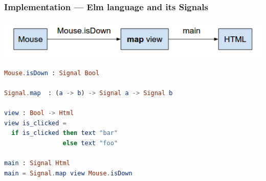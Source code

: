 \documentclass[notes]{beamer}
\begin{document}
\begin{frame}
\begin{adjustwidth}{1em}{0em}
\begin{minipage}{0.40\textwidth}
\begin{flushright}
\end{flushright}
\end{minipage}
\end{adjustwidth}
\end{frame}

\begin{frame}[fragile]
\frametitle{Implementation --- Elm language and its Signals}
\vspace{-1em}
\begin{center}
\includegraphics[width=0.9\linewidth,height=\textheight,keepaspectratio]{demo-imp-1}
\end{center}
\vspace{-1em}
\begin{adjustwidth}{2.5em}{0em}
\begin{lstlisting}[language=elm]
Mouse.isDown : Signal Bool

Signal.map  : (a -> b) -> Signal a -> Signal b

view : Bool -> Html
view is_clicked =
  if is_clicked then text "bar"
                else text "foo"

main : Signal Html
main = Signal.map view Mouse.isDown
\end{lstlisting}
\end{adjustwidth}
\end{frame}
\end{document}
